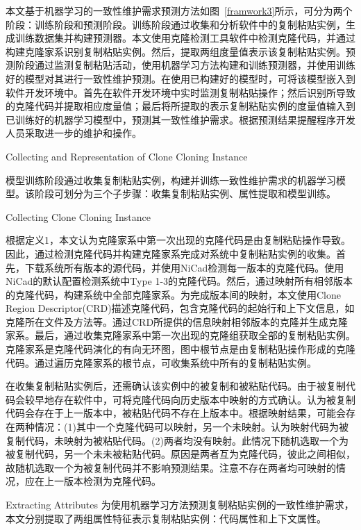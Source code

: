 本文基于机器学习的一致性维护需求预测方法如图~\ref{framwork3}所示，可分为两个阶段：训练阶段和预测阶段。训练阶段通过收集和分析软件中的复制粘贴实例，生成训练数据集并构建预测器。本文使用克隆检测工具软件中检测克隆代码，并通过构建克隆家系识别复制粘贴实例。然后，提取两组度量值表示该复制粘贴实例。预测阶段通过监测复制粘贴活动，使用机器学习方法构建和训练预测器，并使用训练好的模型对其进行一致性维护预测。在使用已构建好的模型时，可将该模型嵌入到软件开发环境中。首先在软件开发环境中实时监测复制粘贴操作；然后识别所导致的克隆代码并提取相应度量值；最后将所提取的表示复制粘贴实例的度量值输入到已训练好的机器学习模型中，预测其一致性维护需求。根据预测结果提醒程序开发人员采取进一步的维护和操作。

{Collecting and Representation of Clone Cloning Instance}

模型训练阶段通过收集复制粘贴实例，构建并训练一致性维护需求的机器学习模型。该阶段可划分为三个子步骤：收集复制粘贴实例、属性提取和模型训练。

{Collecting Clone Cloning Instance}

根据定义1，本文认为克隆家系中第一次出现的克隆代码是由复制粘贴操作导致。因此，通过检测克隆代码并构建克隆家系完成对系统中复制粘贴实例的收集。首先，下载系统所有版本的源代码，并使用NiCad检测每一版本的克隆代码。使用NiCad的默认配置检测系统中Type 1-3的克隆代码。然后，通过映射所有相邻版本的克隆代码，构建系统中全部克隆家系。为完成版本间的映射，本文使用Clone Region Descriptor(CRD)\cite{duala2010clone}描述克隆代码，包含克隆代码的起始行和上下文信息，如克隆所在文件及方法等。通过CRD所提供的信息映射相邻版本的克隆并生成克隆家系\cite{ci2013new}。最后，通过收集克隆家系中第一次出现的克隆组获取全部的复制粘贴实例。克隆家系是克隆代码演化的有向无环图，图中根节点是由复制粘贴操作形成的克隆代码。通过遍历克隆家系的根节点，可收集系统中所有的复制粘贴实例。

在收集复制粘贴实例后，还需确认该实例中的被复制和被粘贴代码。由于被复制代码会较早地存在软件中，可将克隆代码向历史版本中映射的方式确认。认为被复制代码会存在于上一版本中，被粘贴代码不存在上版本中。根据映射结果，可能会存在两种情况：(1)其中一个克隆代码可以映射，另一个未映射。认为映射代码为被复制代码，未映射为被粘贴代码。(2)两者均没有映射。此情况下随机选取一个为被复制代码，另一个未未被粘贴代码。原因是两者互为克隆代码，彼此之间相似，故随机选取一个为被复制代码并不影响预测结果。注意不存在两者均可映射的情况，应在上一版本检测为克隆代码。

{Extracting Attributes}
为使用机器学习方法预测复制粘贴实例的一致性维护需求，本文分别提取了两组属性特征表示复制粘贴实例：代码属性和上下文属性。


